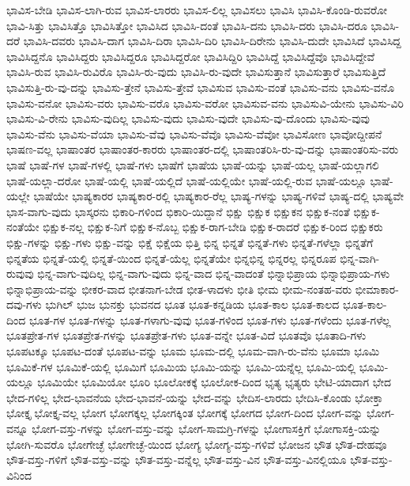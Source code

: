 {ಭಾವಿಸ-ಬೇಡಿ
ಭಾವಿಸ-ಲಾಗಿ-ರುವ
ಭಾವಿಸ-ಲಾರರು
ಭಾವಿಸ-ಲಿಲ್ಲ
ಭಾವಿಸಲು
ಭಾವಿಸಿ
ಭಾವಿಸಿ-ಕೊಂಡಿ-ರುವರೋ
ಭಾವಿ-ಸಿತ್ತು
ಭಾವಿಸಿತ್ತೊ
ಭಾವಿಸಿತ್ತೋ
ಭಾವಿಸಿದ
ಭಾವಿಸಿ-ದಂತೆ
ಭಾವಿಸಿ-ದನು
ಭಾವಿಸಿ-ದರು
ಭಾವಿಸಿ-ದರೂ
ಭಾವಿಸಿ-ದರೆ
ಭಾವಿಸಿ-ದವರು
ಭಾವಿಸಿ-ದಾಗ
ಭಾವಿಸಿ-ದಿರಾ
ಭಾವಿಸಿ-ದಿರಿ
ಭಾವಿಸಿ-ದಿರೇನು
ಭಾವಿಸಿ-ದುದೇ
ಭಾವಿಸಿದೆ
ಭಾವಿಸಿದ್ದ
ಭಾವಿಸಿದ್ದನೊ
ಭಾವಿಸಿದ್ದರು
ಭಾವಿಸಿದ್ದರೂ
ಭಾವಿಸಿದ್ದರೋ
ಭಾವಿಸಿದ್ದಿರಿ
ಭಾವಿಸಿದ್ದೆ
ಭಾವಿಸಿದ್ದೆವೊ
ಭಾವಿಸಿದ್ದೇವೆ
ಭಾವಿಸಿ-ರುವ
ಭಾವಿಸಿ-ರುವಿರೊ
ಭಾವಿಸಿ-ರು-ವುದು
ಭಾವಿಸಿ-ರು-ವುದೇ
ಭಾವಿಸುತ್ತಾನೆ
ಭಾವಿಸುತ್ತಾರೆ
ಭಾವಿಸುತ್ತಿದೆ
ಭಾವಿಸುತ್ತಿ-ರು-ವು-ದನ್ನು
ಭಾವಿಸು-ತ್ತೇನೆ
ಭಾವಿಸು-ತ್ತೇವೆ
ಭಾವಿಸುವ
ಭಾವಿಸು-ವಂತೆ
ಭಾವಿಸು-ವನು
ಭಾವಿಸು-ವನೊ
ಭಾವಿಸು-ವನೋ
ಭಾವಿಸು-ವರು
ಭಾವಿಸು-ವರೊ
ಭಾವಿಸು-ವರೋ
ಭಾವಿಸುವ-ವನು
ಭಾವಿಸುವಿ-ಯೇನು
ಭಾವಿಸು-ವಿರಿ
ಭಾವಿಸು-ವಿ-ರೇನು
ಭಾವಿಸು-ವುದಿಲ್ಲ
ಭಾವಿಸು-ವುದು
ಭಾವಿಸು-ವುದೇ
ಭಾವಿಸು-ವು-ದೊಂದು
ಭಾವಿಸು-ವುವು
ಭಾವಿಸು-ವೆನು
ಭಾವಿಸು-ವೆಯಾ
ಭಾವಿಸು-ವೆವು
ಭಾವಿಸು-ವೆವೊ
ಭಾವಿಸು-ವೆವೋ
ಭಾವಿಸೋಣ
ಭಾವೋದ್ದೀಪನೆ
ಭಾಷಣ-ವಲ್ಲ
ಭಾಷಾಂತರ
ಭಾಷಾಂತರ-ಕಾರರು
ಭಾಷಾಂತರ-ದಲ್ಲಿ
ಭಾಷಾಂತರಿಸಿ-ರು-ವು-ದನ್ನು
ಭಾಷಾಂತರಿಸು-ವರು
ಭಾಷೆ
ಭಾಷೆ-ಗಳ
ಭಾಷೆ-ಗಳಲ್ಲಿ
ಭಾಷೆ-ಗಳು
ಭಾಷೆಗೆ
ಭಾಷೆಯ
ಭಾಷೆ-ಯನ್ನು
ಭಾಷೆ-ಯಲ್ಲ
ಭಾಷೆ-ಯಲ್ಲಾಗಲಿ
ಭಾಷೆ-ಯಲ್ಲಾ-ದರೋ
ಭಾಷೆ-ಯಲ್ಲಿ
ಭಾಷೆ-ಯಲ್ಲಿದೆ
ಭಾಷೆ-ಯಲ್ಲಿಯೇ
ಭಾಷೆ-ಯಲ್ಲಿ-ರುವ
ಭಾಷೆ-ಯಲ್ಲೂ
ಭಾಷೆ-ಯಲ್ಲೇ
ಭಾಷೆಯೇ
ಭಾಷ್ಯಕಾರರ
ಭಾಷ್ಯಕಾರ-ರಲ್ಲಿ
ಭಾಷ್ಯಕಾರ-ರೆಲ್ಲ
ಭಾಷ್ಯ-ಗಳನ್ನು
ಭಾಷ್ಯ-ಗಳಿವೆ
ಭಾಷ್ಯ-ದಲ್ಲಿ
ಭಾಷ್ಯವೇ
ಭಾಸ-ವಾಗು-ವುದು
ಭಾಸ್ಕರನು
ಭಿಕಾರಿ-ಗಳಿಂದ
ಭಿಕಾರಿ-ಯಿದ್ದಾನೆ
ಭಿಕ್ಷು
ಭಿಕ್ಷುಕ
ಭಿಕ್ಷುಕನ
ಭಿಕ್ಷುಕ-ನಂತೆ
ಭಿಕ್ಷುಕ-ನಂತೆಯೇ
ಭಿಕ್ಷುಕ-ನಲ್ಲ
ಭಿಕ್ಷುಕ-ನಿಗೆ
ಭಿಕ್ಷುಕ-ನೊಬ್ಬ
ಭಿಕ್ಷುಕ-ರಾಗ-ಬೇಡಿ
ಭಿಕ್ಷುಕ-ರಾದರೆ
ಭಿಕ್ಷುಕ-ರಿಂದ
ಭಿಕ್ಷುಕರು
ಭಿಕ್ಷು-ಗಳನ್ನು
ಭಿಕ್ಷು-ಗಳು
ಭಿಕ್ಷು-ವನ್ನು
ಭಿಕ್ಷೆ
ಭಿಕ್ಷೆಯ
ಭಿತ್ತಿ
ಭಿನ್ನ
ಭಿನ್ನತೆ
ಭಿನ್ನತೆ-ಗಳು
ಭಿನ್ನತೆ-ಗಳೆಲ್ಲಾ
ಭಿನ್ನತೆಗೆ
ಭಿನ್ನತೆಯ
ಭಿನ್ನತೆ-ಯಲ್ಲಿ
ಭಿನ್ನತೆ-ಯಿಂದ
ಭಿನ್ನತೆ-ಯೆಲ್ಲ
ಭಿನ್ನತೆಯೇ
ಭಿನ್ನಭಿನ್ನ
ಭಿನ್ನರಲ್ಲ
ಭಿನ್ನರೂಪ
ಭಿನ್ನ-ವಾಗಿ-ರುವುವು
ಭಿನ್ನ-ವಾಗು-ವುದಿಲ್ಲ
ಭಿನ್ನ-ವಾಗು-ವುದು
ಭಿನ್ನ-ವಾದ
ಭಿನ್ನ-ವಾದಂತೆ
ಭಿನ್ನಾಭಿಪ್ರಾಯ
ಭಿನ್ನಾಭಿಪ್ರಾಯ-ಗಳು
ಭಿನ್ನಾಭಿಪ್ರಾಯ-ವನ್ನು
ಭೀಕರ-ವಾದ
ಭೀತನಾಗ-ಬೇಡ
ಭೀತ-ಳಾದಳು
ಭೀತಿ
ಭೀಮ
ಭೀಮ-ನಂತಹ-ವರು
ಭೀಮಾಕಾರ-ದವು-ಗಳು
ಭುಗಿಲ್
ಭುಜ
ಭುನಕ್ತು
ಭುವನದ
ಭೂತ
ಭೂತ-ಕನ್ನಡಿಯ
ಭೂತ-ಕಾಲ
ಭೂತ-ಕಾಲದ
ಭೂತ-ಕಾಲ-ದಿಂದ
ಭೂತ-ಗಳ
ಭೂತ-ಗಳನ್ನು
ಭೂತ-ಗಳಾಗು-ವುವು
ಭೂತ-ಗಳಿಂದ
ಭೂತ-ಗಳು
ಭೂತ-ಗಳೆಂದು
ಭೂತ-ಗಳೆಲ್ಲ
ಭೂತಪ್ರೇತ-ಗಳ
ಭೂತಪ್ರೇತ-ಗಳನ್ನು
ಭೂತಪ್ರೇತ-ಗಳು
ಭೂತ-ವನ್ನೇ
ಭೂತ-ವಿದೆ
ಭೂತವೊ
ಭೂತಾದಿ-ಗಳು
ಭೂಪಟಕ್ಕೂ
ಭೂಪಟ-ದಂತೆ
ಭೂಪಟ-ವನ್ನು
ಭೂಮ
ಭೂಮ-ದಲ್ಲಿ
ಭೂಮ-ವಾಗಿ-ರು-ವೆನು
ಭೂಮಾ
ಭೂಮಿ
ಭೂಮಿಕೆ-ಗಳ
ಭೂಮಿಕೆ-ಯಲ್ಲಿ
ಭೂಮಿಗೆ
ಭೂಮಿಯ
ಭೂಮಿ-ಯನ್ನು
ಭೂಮಿ-ಯನ್ನೆಲ್ಲ
ಭೂಮಿ-ಯಲ್ಲಿ
ಭೂಮಿ-ಯಲ್ಲೂ
ಭೂಮಿಯೇ
ಭೂಮಿಯೋ
ಭೂರಿ
ಭೂಲೋಕಕ್ಕೆ
ಭೂಲೋಕ-ದಿಂದ
ಭೃತ್ಯ
ಭೃತ್ಯರು
ಭೇಟಿ-ಯಾದಾಗ
ಭೇದ
ಭೇದ-ಗಳಿಲ್ಲ
ಭೇದ-ಭಾವನೆಯ
ಭೇದ-ಭಾವನೆ-ಯನ್ನು
ಭೇದ-ವನ್ನು
ಭೇದಿಸ-ಲಾರದು
ಭೇದಿಸಿ-ಕೊಂಡು
ಭೋಕ್ತಾ
ಭೋಕ್ತೃ
ಭೋಕ್ತೃ-ವಲ್ಲ
ಭೋಗ
ಭೋಗಕ್ಕಲ್ಲ
ಭೋಗಕ್ಕಿಂತ
ಭೋಗಕ್ಕೆ
ಭೋಗದ
ಭೋಗ-ದಿಂದ
ಭೋಗ-ವನ್ನು
ಭೋಗ-ವನ್ನೂ
ಭೋಗ-ವಸ್ತು-ಗಳನ್ನು
ಭೋಗ-ವಸ್ತು-ವನ್ನು
ಭೋಗ-ಸಾಮಗ್ರಿ-ಗಳನ್ನು
ಭೋಗಾಸಕ್ತಿಗೆ
ಭೋಗಾಸಕ್ತಿ-ಯನ್ನು
ಭೋಗಿ-ಸುವರೊ
ಭೋಗೇಚ್ಛೆ
ಭೋಗೇಚ್ಛೆ-ಯಿಂದ
ಭೋಗ್ಯ
ಭೋಗ್ಯ-ವಸ್ತು-ಗಳಿವೆ
ಭೋಜನ
ಭೌತ
ಭೌತ-ದೇಹವೂ
ಭೌತ-ವಸ್ತು-ಗಳಿಗೆ
ಭೌತ-ವಸ್ತು-ವನ್ನು
ಭೌತ-ವಸ್ತು-ವನ್ನೆಲ್ಲ
ಭೌತ-ವಸ್ತು-ವಿನ
ಭೌತ-ವಸ್ತು-ವಿನಲ್ಲಿಯೂ
ಭೌತ-ವಸ್ತು-ವಿನಿಂದ
}
